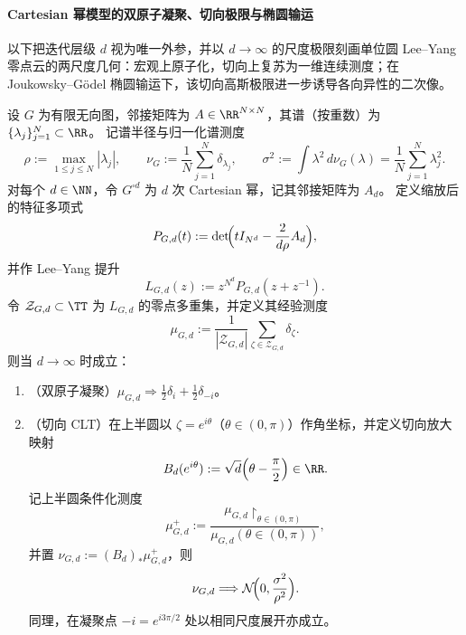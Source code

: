 \paragraph{Cartesian 幂模型的双原子凝聚、切向极限与椭圆输运}
以下把迭代层级 \(d\) 视为唯一外参，并以 \(d\to\infty\) 的尺度极限刻画单位圆 Lee--Yang 零点云的两尺度几何：宏观上原子化，切向上复苏为一维连续测度；在 Joukowsky--Gödel 椭圆输运下，该切向高斯极限进一步诱导各向异性的二次像。

\begin{theorem}\label{thm:xi-cartesian-power-leyang-double-atom-tangent-clt}
设 \(G\) 为有限无向图，邻接矩阵为 \(A\in\RR^{N\times N}\)，其谱（按重数）为 \(\{\lambda_j\}_{j=1}^{N}\subset\RR\)。
记谱半径与归一化谱测度
\[
\rho:=\max_{1\le j\le N}|\lambda_j|,
\qquad
\nu_G:=\frac1N\sum_{j=1}^{N}\delta_{\lambda_j},
\qquad
\sigma^2:=\int \lambda^2\,d\nu_G(\lambda)=\frac1N\sum_{j=1}^{N}\lambda_j^2.
\]
对每个 \(d\in\NN\)，令 \(G^{\square d}\) 为 \(d\) 次 Cartesian 幂，记其邻接矩阵为 \(A_d\)。
定义缩放后的特征多项式
\[
P_{G,d}(t):=\det\!\Bigl(t I_{N^d}-\frac{2}{d\rho}A_d\Bigr),
\]
并作 Lee--Yang 提升
\[
L_{G,d}(z):=z^{N^d}P_{G,d}(z+z^{-1}).
\]
令 \(\mathcal Z_{G,d}\subset\TT\) 为 \(L_{G,d}\) 的零点多重集，并定义其经验测度
\[
\mu_{G,d}:=\frac1{|\mathcal Z_{G,d}|}\sum_{\zeta\in\mathcal Z_{G,d}}\delta_{\zeta}.
\]
则当 \(d\to\infty\) 时成立：
\begin{enumerate}
  \item \textup{（双原子凝聚）}\(\mu_{G,d}\Longrightarrow \tfrac12\delta_{i}+\tfrac12\delta_{-i}\)。
  \item \textup{（切向 CLT）}在上半圆以 \(\zeta=e^{i\theta}\)（\(\theta\in(0,\pi)\)）作角坐标，并定义切向放大映射
  \[
  B_d(e^{i\theta}):=\sqrt d\Bigl(\theta-\frac{\pi}{2}\Bigr)\in\RR.
  \]
  记上半圆条件化测度
  \[
  \mu_{G,d}^{+}
  :=\frac{\mu_{G,d}\restriction_{\theta\in(0,\pi)}}{\mu_{G,d}(\theta\in(0,\pi))},
  \]
  并置 \(\nu_{G,d}:=(B_d)_*\mu_{G,d}^{+}\)，则
  \[
  \nu_{G,d}\Longrightarrow \mathcal N\!\Bigl(0,\frac{\sigma^2}{\rho^2}\Bigr).
  \]
  同理，在凝聚点 \(-i=e^{i3\pi/2}\) 处以相同尺度展开亦成立。
\end{enumerate}
\end{theorem}

